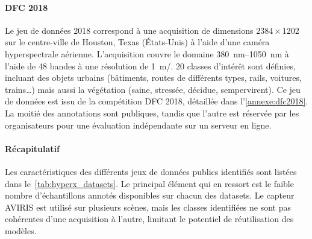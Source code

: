 
\paragraph{DFC 2018}
Le jeu de données  2018 correspond à une acquisition de dimensions $2384\times1202$ sur le centre-ville de Houston, Texas (États-Unis) à l'aide d'une caméra hyperspectrale aérienne. L'acquisition couvre le domaine \SIrange{380}{1050}{\nano\meter} à l'aide de 48 bandes à une résolution de \SI{1}{\meter/\px}. 20 classes d'intérêt sont définies, incluant des objets urbains (bâtiments, routes de différents types, rails, voitures, trains\dots) mais aussi la végétation (saine, stressée, décidue, sempervirent). Ce jeu de données est issu de la compétition \glsdesc{DFC} 2018, détaillée dans l'\cref{annexe:dfc2018}. La moitié des annotations sont publiques, tandis que l'autre est réservée par les organisateurs pour une évaluation indépendante sur un serveur en ligne.

\paragraph{Récapitulatif}

Les caractéristiques des différents jeux de données publics identifiés sont listées dans le~\cref{tab:hyperx_datasets}. Le principal élément qui en ressort est le faible nombre d'échantillons annotés disponibles sur chacun des datasets. Le capteur \gls{AVIRIS} est utilisé sur plusieurs scènes, mais les classes identifiées ne sont pas cohérentes d'une acquisition à l'autre, limitant le potentiel de réutilisation des modèles.

